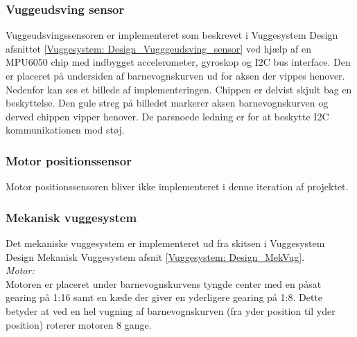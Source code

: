 \subsubsection{Vuggeudsving sensor}
\label{Vuggesystem: Implementering_VuggeudsvingSensor}
Vuggeudsvingssensoren er implementeret som beskrevet i Vuggesystem Design afsnittet \vref{Vuggesystem: Design_Vugggeudsving_sensor} ved hjælp af en MPU6050 chip med indbygget accelerometer, gyroskop og I2C bus interface. Den er placeret på undersiden af barnevognskurven ud for aksen der vippes henover. Nedenfor kan ses et billede af implementeringen. 
Chippen er delvist skjult bag en beskyttelse. Den gule streg på billedet markerer aksen barnevognskurven og derved chippen vipper henover. 
De parsnoede ledning er for at beskytte I2C kommunikationen mod støj.


\subsubsection{Motor positionssensor}
Motor positionssensoren bliver ikke implementeret i denne iteration af projektet.

\newpage
\subsubsection{Mekanisk vuggesystem}
\label{Vuggesystem: Implementering_MV} 
Det mekaniske vuggesystem er implementeret ud fra skitsen i Vuggesystem Design Mekanisk Vuggesystem afsnit \vref{Vuggesystem: Design_MekVug}. \\
\textit{Motor:}\\
Motoren er placeret under barnevognskurvens tyngde center med en påsat gearing på 1:16 samt en kæde der giver en yderligere gearing på 1:8. Dette betyder at ved en hel vugning af barnevognskurven (fra yder position til yder position) roterer motoren 8 gange.

